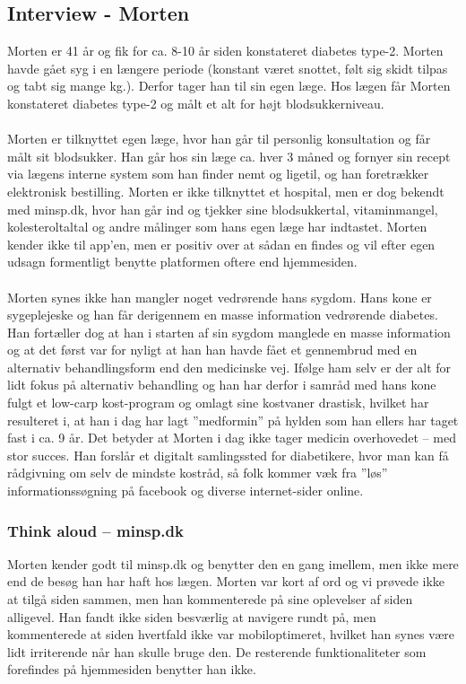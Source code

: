 \subsection{Interview - Morten}
Morten er 41 år og fik for ca. 8-10 år siden konstateret diabetes type-2. Morten havde gået syg i en længere periode (konstant været snottet, følt sig skidt tilpas og tabt sig mange kg.). Derfor tager han til sin egen læge. Hos lægen får Morten konstateret diabetes type-2 og målt et alt for højt blodsukkerniveau.
\\ \\
Morten er tilknyttet egen læge, hvor han går til personlig konsultation og får målt sit blodsukker. Han går hos sin læge ca. hver 3 måned og fornyer sin recept via lægens interne system som han finder nemt og ligetil, og han foretrækker elektronisk bestilling. Morten er ikke tilknyttet et hospital, men er dog bekendt med minsp.dk, hvor han går ind og tjekker sine blodsukkertal, vitaminmangel, kolesteroltaltal og andre målinger som hans egen læge har indtastet. Morten kender ikke til app'en, men er positiv over at sådan en findes og vil efter egen udsagn formentligt benytte platformen oftere end hjemmesiden. 
\\ \\
Morten synes ikke han mangler noget vedrørende hans sygdom. Hans kone er sygeplejeske og han får derigennem en masse information vedrørende diabetes. Han fortæller dog at han i starten af sin sygdom manglede en masse information og at det først var for nyligt at han han havde fået et gennembrud med en alternativ behandlingsform end den medicinske vej. Ifølge ham selv er der alt for lidt fokus på alternativ behandling og han har derfor i samråd med hans kone fulgt et low-carp kost-program og omlagt sine kostvaner drastisk, hvilket har resulteret i, at han i dag har lagt ”medformin” på hylden som han ellers har taget fast i ca. 9 år. Det betyder at Morten i dag ikke tager medicin overhovedet – med stor succes. Han forslår et digitalt samlingssted for diabetikere, hvor man kan få rådgivning om selv de mindste kostråd, så folk kommer væk fra ”løs” informationssøgning på facebook og diverse internet-sider online. 

\subsubsection*{Think aloud – minsp.dk}
Morten kender godt til minsp.dk og benytter den en gang imellem, men ikke mere end de besøg han har haft hos lægen. Morten var kort af ord og vi prøvede ikke at tilgå siden sammen, men han kommenterede på sine oplevelser af siden alligevel. Han fandt ikke siden besværlig at navigere rundt på, men kommenterede at siden hvertfald ikke var mobiloptimeret, hvilket han synes være lidt irriterende når han skulle bruge den. De resterende funktionaliteter som forefindes på hjemmesiden benytter han ikke.
